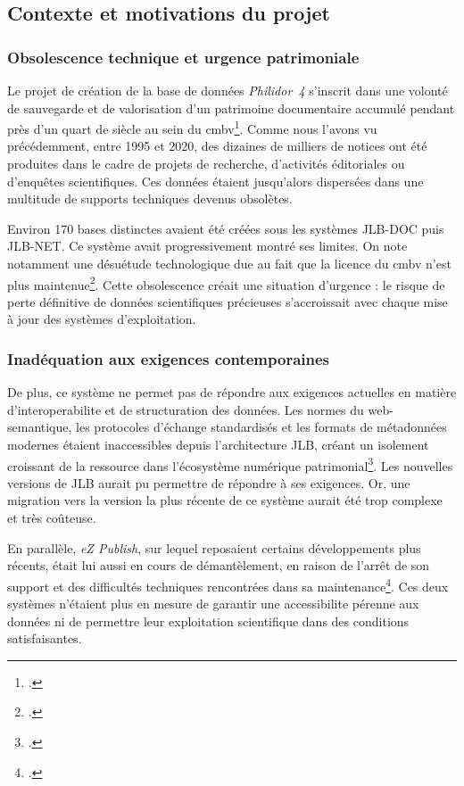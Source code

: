 \subsection{Contexte et motivations du projet}

\subsubsection{Obsolescence technique et urgence patrimoniale}

Le projet de création de la base de données \textit{Philidor~4} s'inscrit dans une volonté de sauvegarde et de valorisation d'un patrimoine documentaire accumulé pendant près d'un quart de siècle au sein du \gls{cmbv}\footcite{BaseDonneesPHILIDOR42024}. Comme nous l'avons vu précédemment, entre 1995 et 2020, des dizaines de milliers de notices ont été produites dans le cadre de projets de recherche, d'activités éditoriales ou d'enquêtes scientifiques. Ces données étaient jusqu'alors dispersées dans une multitude de supports techniques devenus obsolètes.

Environ 170 bases distinctes avaient été créées sous les systèmes JLB-DOC puis JLB-NET. Ce système avait progressivement montré ses limites. On note notamment une désuétude technologique due au fait que la licence du \gls{cmbv} n'est plus maintenue\footcite{laurentguilloRapportMigrationAnciennes2022}. Cette obsolescence créait une situation d'urgence : le risque de perte définitive de données scientifiques précieuses s'accroissait avec chaque mise à jour des systèmes d'exploitation.

\subsubsection{Inadéquation aux exigences contemporaines}

De plus, ce système ne permet pas de répondre aux exigences actuelles en matière d'\gls{interoperabilite} et de structuration des données. Les normes du \gls{web-semantique}, les protocoles d'échange standardisés et les formats de métadonnées modernes étaient inaccessibles depuis l'architecture JLB, créant un isolement croissant de la ressource dans l'écosystème numérique patrimonial\footcite{laurentguilloRapportMigrationAnciennes2022}. Les nouvelles versions de JLB aurait pu permettre de répondre à ses exigences. Or, une migration vers la version la plus récente de ce système aurait été trop complexe et très coûteuse.

En parallèle, \textit{eZ Publish}, sur lequel reposaient certains développements plus récents, était lui aussi en cours de démantèlement, en raison de l'arrêt de son support et des difficultés techniques rencontrées dans sa maintenance\footcite{laurentguilloRapportMigrationAnciennes2022}. Ces deux systèmes n'étaient plus en mesure de garantir une \gls{accessibilite} pérenne aux données ni de permettre leur exploitation scientifique dans des conditions satisfaisantes.

